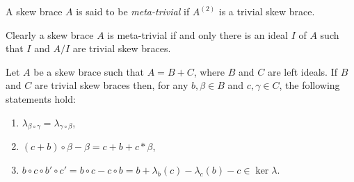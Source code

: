 \begin{definition}
A skew brace $A$ is said to be \emph{meta-trivial} if $A^{(2)}$ is a trivial skew brace. 
\end{definition}

Clearly a skew brace $A$ is meta-trivial if and only there is 
an ideal $I$ of $A$ such that $I$ and $A/I$ are trivial skew braces.


\begin{lemma}\label{lem:calculations}
    Let $A$ be a skew brace such that $A = B+C$, where $B$ and $C$ are left ideals. If $B$ and $C$ are trivial skew braces then,
    for any $b,\beta \in B$ and $c,\gamma \in C$, the following statements hold:
	\begin{enumerate}
	    \item $\lambda_{\beta \circ \gamma} = \lambda_{\gamma \circ \beta}$,
	    \item $(c + b) \circ \beta - \beta = c + b + c* \beta $,
	    \item $b\circ c \circ b' \circ c' = b \circ c - c\circ b = b + \lambda_b(c) - \lambda_c(b) -c \in \ker \lambda$.
	\end{enumerate}
\end{lemma}

